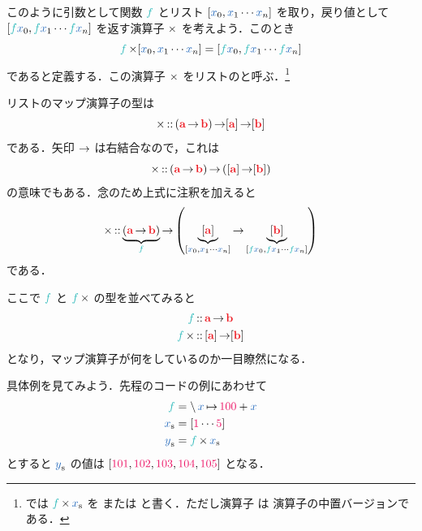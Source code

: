\documentclass[a5paper,twoside,fleqn,draft]{jsbook}
\begin{document}
このように引数として関数 $\hFunc{f}$ とリスト $\hListWith{\hVar{x}_0,\hVar{x}_1\dotsb \hVar{x}_n}$ を取り，戻り値として $\hListWith{\hFunc{f}\hVar{x}_0,\hFunc{f}\hVar{x}_1\dotsb \hFunc{f}\hVar{x}_n}$ を返す演算子 $\operatorname{\times}$ を考えよう．このとき
\begin{equation}
  \hFunc{f}\hMap\hListWith{\hVar{x}_0,\hVar{x}_1\dotsb \hVar{x}_n}
  =\hListWith{\hFunc{f}\hVar{x}_0,\hFunc{f}\hVar{x}_1\dotsb \hFunc{f}\hVar{x}_n}
\end{equation}
であると定義する．この演算子 $\operatorname{\times}$ をリストのと呼ぶ．\footnote{\haskell では $\hFunc{f}\hMap\hListVar{x}$ を または  と書く．ただし演算子 \code{<\$>} は  演算子の中置バージョンである．}

リストのマップ演算子の型は
\begin{equation}
  \hMap
  \hIsTypeOf{}(\hTypeName{a}\hFunctionArrow\hTypeName{b})\hFunctionArrow\hListConstruct{\hTypeName{a}}\hFunctionArrow[\hTypeName{b}]
\end{equation}
である．矢印 $\operatorname{\rightarrow}$ は右結合なので，これは
\begin{equation}
  \hMap
  \hIsTypeOf{}(\hTypeName{a}\hFunctionArrow\hTypeName{b})\hFunctionArrow\left(\hListConstruct{\hTypeName{a}}\hFunctionArrow[\hTypeName{b}]\right)
\end{equation}
の意味でもある．念のため上式に注釈を加えると
\begin{equation}
  \hMap
  \hIsTypeOf\underbrace{\left(\hTypeName{a}\hFunctionArrow\hTypeName{b}\right)}_{\hFunc{f}}
  \hFunctionArrow\left(\underbrace{\hListConstruct{\hTypeName{a}}}_{[\hVar{x}_0,\hVar{x}_1\dotsb \hVar{x}_n]}
  \hFunctionArrow\underbrace{[\hTypeName{b}]}_{[\hFunc{f}\hVar{x}_0,\hFunc{f}\hVar{x}_1\dotsb \hFunc{f}\hVar{x}_n]}\right)
\end{equation}
である．

ここで $\hFunc{f}$ と $\hFunc{f}\hMap$ の型を並べてみると
\begin{align}
  \hFunc{f}
  &\hIsTypeOf\hTypeName{a}\hFunctionArrow\hTypeName{b}\\
  \hFunc{f}\hMap
  &\hIsTypeOf{}\hListConstruct{\hTypeName{a}}\hFunctionArrow[\hTypeName{b}]
\end{align}
となり，マップ演算子が何をしているのか一目瞭然になる．


具体例を見てみよう．先程の\python コードの例にあわせて
\begin{align}
  \hFunc{f}
  &=\mLambda\hVar{x}\mLambdaArrow\hConstant{100}+\hVar{x}\\
  \hListVar{x}
  &=[\hConstant{1}\dotsb\hConstant{5}]\\
  \hListVar{y}
  &=\hFunc{f}\hMap\hListVar{x}
\end{align}
とすると $\hListVar{y}$ の値は $[\hConstant{101},\hConstant{102},\hConstant{103},\hConstant{104},\hConstant{105}]$ となる．
\end{document}
